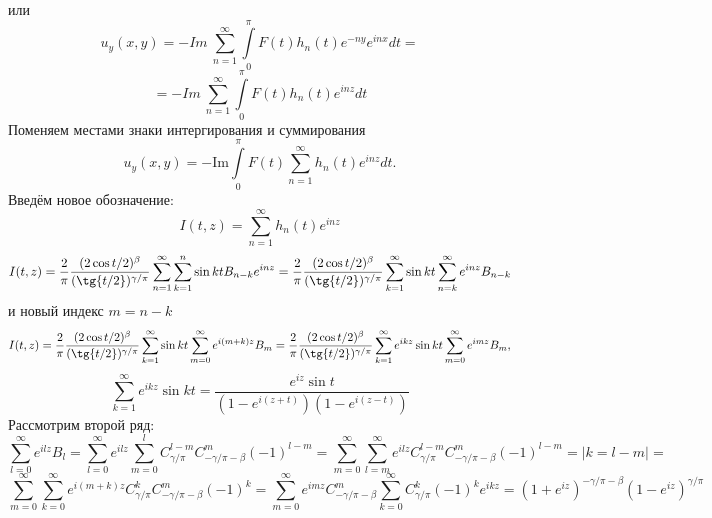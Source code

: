 \documentclass[9pt]{article}
\begin{document}
или
\begin{equation*}
	u_y(x,y) = -  Im \ \sum\limits_{n=1}^{\infty}  \int\limits_0^\pi F(t)  h_{n}(t)  e^{-ny} e^{inx} dt = 
\end{equation*}
\begin{equation*}
	= -  Im \ \sum\limits_{n=1}^{\infty}  \int\limits_0^\pi F(t)  h_{n}(t)  e^{inz}  dt 
\end{equation*}
Поменяем местами знаки интергирования и суммирования
\begin{equation*}
	u_y(x,y)  = -  \mathrm{Im}  \int\limits_0^\pi F(t)  \sum\limits_{n=1}^{\infty}   h_{n}(t)  e^{in z}  dt.
\end{equation*}
Введём новое обозначение:
\begin{equation*}
	I(t,z) = \sum\limits_{n=1}^{\infty}  h_{n}(t)  e^{in z}
\end{equation*}
\begin{equation*}
	I(t,z) =\dfrac{2}{\pi}\dfrac{(2\cos{t/2})^\beta}{(\tg{t/2})^{\gamma/\pi}} \sum\limits_{n=1}^{\infty}   \sum\limits_{k=1}^n \sin{kt} B_{n-k} e^{inz} = 
	\dfrac{2}{\pi}\dfrac{(2\cos{t/2})^\beta}{(\tg{t/2})^{\gamma/\pi}} \sum\limits_{k=1}^{\infty} \sin{kt} \sum\limits_{n=k}^{\infty} e^{inz} B_{n-k}
\end{equation*}
и новый индекс $m = n - k$
\begin{equation*}
	I(t,z) = \dfrac{2}{\pi}\dfrac{(2\cos{t/2})^\beta}{(\tg{t/2})^{\gamma/\pi}} \sum\limits_{k=1}^{\infty} \sin{kt} \sum\limits_{m =0 }^{\infty} e^{i(m+k)z} B_{m} = 
	\dfrac{2}{\pi}\dfrac{(2\cos{t/2})^\beta}{(\tg{t/2})^{\gamma/\pi}} \sum\limits_{k=1}^{\infty} e^{ikz}\sin{kt} \sum\limits_{m =0 }^{\infty} e^{imz} B_{m},
\end{equation*}
\begin{equation*}
	\sum\limits_{k=1}^{\infty} e^{ikz}\sin{kt} =  \dfrac{e^{iz} \sin{t}}{\left(1 - e^{i(z+t)} \right) \left(1 - e^{i(z-t)}\right)}
\end{equation*}
Рассмотрим второй ряд:
\begin{equation*}
	\sum\limits_{l =0 }^{\infty} e^{ilz} B_{l} = \sum\limits_{l =0 }^{\infty} e^{ilz} \sum\limits_{m=0}^{l} C^{l - m}_{\gamma/\pi} C^{m}_{-\gamma/\pi - \beta} (-1)^{l-m} = \sum\limits_{m=0}^{\infty} \sum\limits_{l=m}^{\infty} e^{ilz} C^{l - m}_{\gamma/\pi} C^{m}_{-\gamma/\pi - \beta} (-1)^{l-m} = |k = l - m| = 
\end{equation*}
\begin{equation*}
	\sum\limits_{m=0}^{\infty} \sum\limits_{k=0}^{\infty} e^{i(m+k)z} C^{k}_{\gamma/\pi} C^{m}_{-\gamma/\pi - \beta} (-1)^{k} = \sum\limits_{m=0}^{\infty} e^{imz} C^{m}_{-\gamma/\pi - \beta} \sum\limits_{k=0}^{\infty}  C^{k}_{\gamma/\pi} (-1)^k e^{ikz} = (1 + e^{iz})^{-\gamma/\pi - \beta} (1- e^{iz})^{\gamma/\pi}
\end{equation*}
\end{document}

